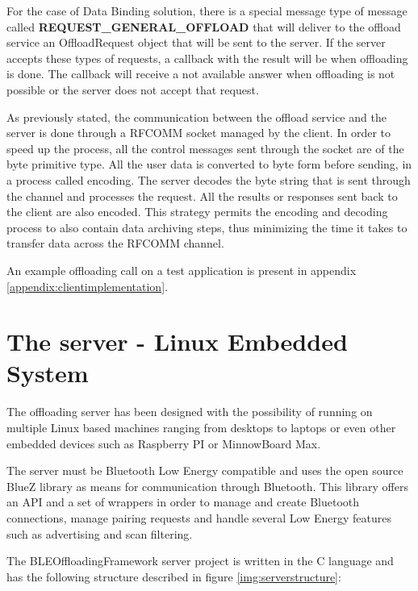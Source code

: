 For the case of Data Binding solution, there is a special message type of message called \textbf{REQUEST_GENERAL_OFFLOAD} that will deliver to the offload service an OffloadRequest object that will be sent to the server. If the server accepts these types of requests, a callback with the result will be when offloading is done. The callback will receive a not available answer when offloading is not possible or the server does not accept that request.

As previously stated, the communication between the offload service and the server is done through a RFCOMM socket managed by the client. In order to speed up the process, all the control messages sent through the socket are of the byte primitive type. All the user data is converted to byte form before sending, in a process called encoding. The server decodes the byte string that is sent through the channel and processes the request. All the results or responses sent back to the client are also encoded. This strategy permits the encoding and decoding process to also contain data archiving steps, thus minimizing the time it takes to transfer data across the RFCOMM channel.

An example offloading call on a test application is present in appendix \ref{appendix:clientimplementation}.

\pagebreak

\section{The server - Linux Embedded System}

The offloading server has been designed with the possibility of running on multiple Linux based machines ranging from desktops to laptops or even other embedded devices such as Raspberry PI or MinnowBoard Max.

The server must be Bluetooth Low Energy compatible and uses the open source BlueZ\cite{holtmann2007bluez} library as means for communication through Bluetooth. This library offers an API and a set of wrappers in order to manage and create Bluetooth connections, manage pairing requests and handle several Low Energy features such as advertising and scan filtering.

The BLEOffloadingFramework server project is written in the C language and has the following structure described in figure \ref{img:serverstructure}:


